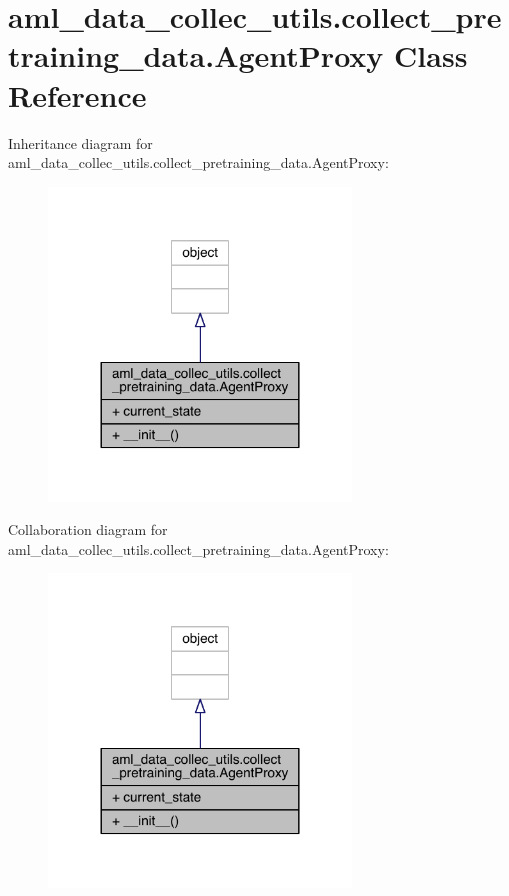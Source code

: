 \hypertarget{classaml__data__collec__utils_1_1collect__pretraining__data_1_1_agent_proxy}{}\section{aml\+\_\+data\+\_\+collec\+\_\+utils.\+collect\+\_\+pretraining\+\_\+data.\+Agent\+Proxy Class Reference}
\label{classaml__data__collec__utils_1_1collect__pretraining__data_1_1_agent_proxy}


Inheritance diagram for aml\+\_\+data\+\_\+collec\+\_\+utils.\+collect\+\_\+pretraining\+\_\+data.\+Agent\+Proxy\+:\nopagebreak
\begin{figure}[H]
\begin{center}
\leavevmode
\includegraphics[width=228pt]{classaml__data__collec__utils_1_1collect__pretraining__data_1_1_agent_proxy__inherit__graph}
\end{center}
\end{figure}


Collaboration diagram for aml\+\_\+data\+\_\+collec\+\_\+utils.\+collect\+\_\+pretraining\+\_\+data.\+Agent\+Proxy\+:\nopagebreak
\begin{figure}[H]
\begin{center}
\leavevmode
\includegraphics[width=228pt]{classaml__data__collec__utils_1_1collect__pretraining__data_1_1_agent_proxy__coll__graph}
\end{center}
\end{figure}
